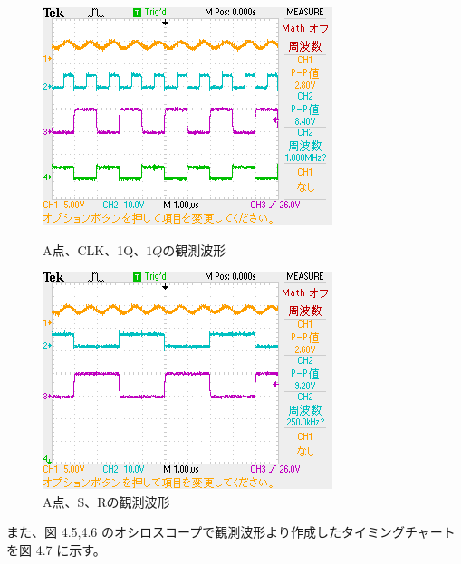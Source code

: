 \documentclass{jlreq}
\numberwithin{equation}{section}
\begin{document}
\begin{figure}[H]
  \centering
  \begin{minipage}{0.48\textwidth}
    \centering
    \includegraphics[width=\textwidth]{assets/sg01.png}
    \caption{A点、CLK、1Q、\(\overline{1Q}\)の観測波形}
  \end{minipage}
  \hfill
  \begin{minipage}{0.48\textwidth}
    \centering
    \includegraphics[width=\textwidth]{assets/sg02.png}
    \caption{A点、S、Rの観測波形}
  \end{minipage}
\end{figure}

また、図 4.5,4.6 のオシロスコープで観測波形より作成したタイミングチャートを図 4.7 に示す。
\end{document}
